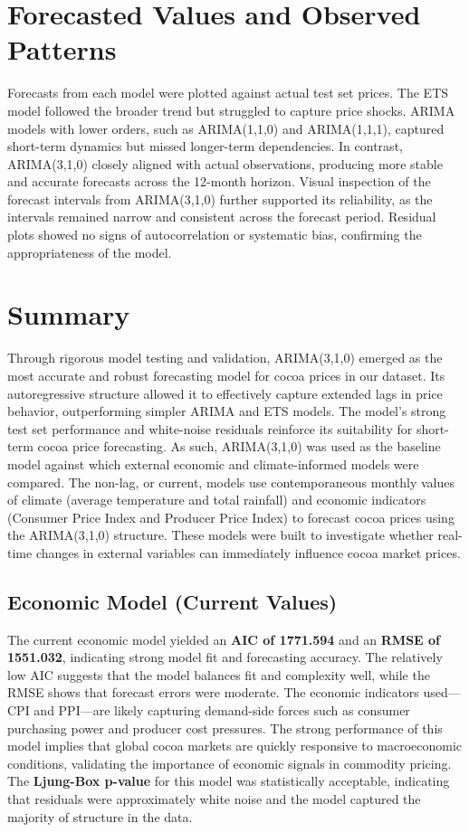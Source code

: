 \section{Forecasted Values and Observed Patterns}

Forecasts from each model were plotted against actual test set prices. The ETS model followed the broader trend but struggled to capture price shocks. ARIMA models with lower orders, such as ARIMA(1,1,0) and ARIMA(1,1,1), captured short-term dynamics but missed longer-term dependencies. In contrast, ARIMA(3,1,0) closely aligned with actual observations, producing more stable and accurate forecasts across the 12-month horizon. Visual inspection of the forecast intervals from ARIMA(3,1,0) further supported its reliability, as the intervals remained narrow and consistent across the forecast period. Residual plots showed no signs of autocorrelation or systematic bias, confirming the appropriateness of the model.

\section{Summary}

Through rigorous model testing and validation, ARIMA(3,1,0) emerged as the most accurate and robust forecasting model for cocoa prices in our dataset. Its autoregressive structure allowed it to effectively capture extended lags in price behavior, outperforming simpler ARIMA and ETS models. The model’s strong test set performance and white-noise residuals reinforce its suitability for short-term cocoa price forecasting. As such, ARIMA(3,1,0) was used as the baseline model against which external economic and climate-informed models were compared. The non-lag, or current, models use contemporaneous monthly values of climate (average temperature and total rainfall) and economic indicators (Consumer Price Index and Producer Price Index) to forecast cocoa prices using the ARIMA(3,1,0) structure. These models were built to investigate whether real-time changes in external variables can immediately influence cocoa market prices.

\subsection{Economic Model (Current Values)}

The current economic model yielded an \textbf{AIC of 1771.594} and an \textbf{RMSE of 1551.032}, indicating strong model fit and forecasting accuracy. The relatively low AIC suggests that the model balances fit and complexity well, while the RMSE shows that forecast errors were moderate. The economic indicators used—CPI and PPI—are likely capturing demand-side forces such as consumer purchasing power and producer cost pressures. The strong performance of this model implies that global cocoa markets are quickly responsive to macroeconomic conditions, validating the importance of economic signals in commodity pricing.
The \textbf{Ljung-Box p-value} for this model was statistically acceptable, indicating that residuals were approximately white noise and the model captured the majority of structure in the data.

